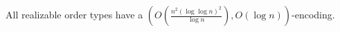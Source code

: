 \begin{contribution}[label=thm:realizable,restate=TheoremGPTRealizable]
  All realizable order types have a
  \((O(\frac{n^2 {(\log \log n)}^2}{\log n}), O(\log n))\)-encoding.
\end{contribution}
